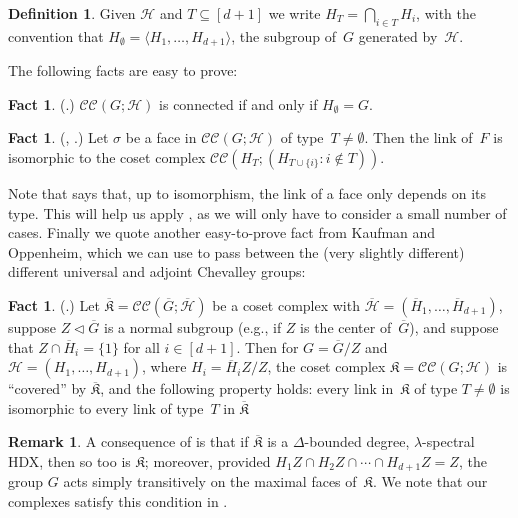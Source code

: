 \documentclass[10pt,a4paper]{article}
\theoremstyle{definition}
\newtheorem{definition}[theorem]{Definition}
\newtheorem{remark}[theorem]{Remark}
\newtheorem{fact}[theorem]{Fact}
\newcommand{\la}{\langle}
\newcommand{\ra}{\rangle}
\newcommand{\ol}[1]{\overline{#1}}
\newcommand{\calH}{\mathcal{H}}
\newcommand{\knote}[1]{}
\newcommand{\CC}[2]{\mathcal{C}\mathcal{C}(#1;#2)}
\newcommand{\complex}{\mathfrak{K}}
\begin{document}
\begin{definition}
    Given $\calH$ and $T \subseteq [d+1]$ we write $H_T = \bigcap_{i \in T} H_i$, with the convention that $H_\emptyset = \la H_1, \dots, H_{d+1} \ra$, the subgroup of~$G$ generated by~$\calH$.
\end{definition}
The following facts are easy to prove:
\begin{fact}                                        \label{fact:connected}
    (\cite{AH93}.)
    $\CC{G}{\calH}$ is connected  if and only if $H_\emptyset = G$.
\end{fact}
\begin{fact}                                        \label{fact:link}
    (\cite[p.~13]{Gar79}, \cite{HS19}.)
    Let $\sigma$ be a face in $\CC{G}{\calH}$ of type~$T \neq \emptyset$.
    Then the link of~$F$ is isomorphic to the coset complex $\CC{H_T}{(H_{T \cup \{i\}} : i \not \in T)}$.
\end{fact}
Note that  says that, up to isomorphism, the link of a face only depends on its type. This will help us apply , as we will only have to consider a small number of cases.
Finally we quote another easy-to-prove fact from Kaufman and Oppenheim, which we can use to pass between the (very slightly different) different universal and adjoint Chevalley groups:
\begin{fact}                                     \label{fact:ko2.4}
    (\cite[essentially Prop.~2.12]{KO18}.)
    Let $\overline{\complex} = \CC{\ol{G}}{\ol{\calH}}$ be a coset complex with $\ol{\calH} = (\ol{H}_1, \dots, \ol{H}_{d+1})$, suppose $Z \triangleleft \ol{G}$ is a normal subgroup (e.g., if $Z$ is the center of~$\ol{G}$), and suppose that $Z \cap \ol{H}_i = \{1\}$ for all $i \in [d+1]$.
    Then for $G = \ol{G} / Z$ and $\calH= (H_1, \dots, H_{d+1})$, where $H_i = \ol{H}_i Z / Z$, the coset complex $\complex = \CC{G}{\calH}$ is ``covered'' by $\overline{\complex}$, and the following property holds: every link in~$\complex$ of type $T \neq \emptyset$ is isomorphic to every link of type~$T$ in $\ol{\complex}$
\end{fact}
\begin{remark}  \label{rem:get-to-adjoint}
    A consequence of  is that if $\overline{\complex}$ is a $\Delta$-bounded degree, $\lambda$-spectral HDX, then so too is $\complex$; moreover, provided $H_1 Z \cap H_2 Z \cap \cdots \cap H_{d+1} Z = Z$, the group $G$ acts simply transitively on the maximal faces of~$\complex$. We note that our complexes satisfy this condition in .
\end{remark}
\end{document}
